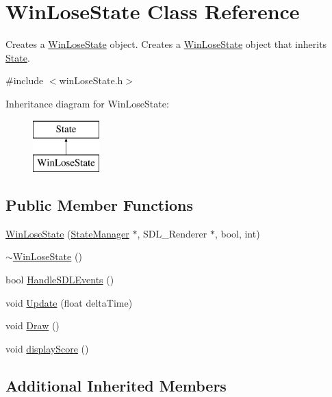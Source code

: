 \hypertarget{class_win_lose_state}{\section{Win\+Lose\+State Class Reference}
\label{class_win_lose_state}
}


Creates a \hyperlink{class_win_lose_state}{Win\+Lose\+State} object. Creates a \hyperlink{class_win_lose_state}{Win\+Lose\+State} object that inherits \hyperlink{class_state}{State}.  




{\ttfamily \#include $<$win\+Lose\+State.\+h$>$}

Inheritance diagram for Win\+Lose\+State\+:\begin{figure}[H]
\begin{center}
\leavevmode
\includegraphics[height=2.000000cm]{class_win_lose_state}
\end{center}
\end{figure}
\subsection*{Public Member Functions}
\begin{DoxyCompactItemize}
\item 
\hyperlink{class_win_lose_state_a047ccdc0cc156d65c076eb845398ef84}{Win\+Lose\+State} (\hyperlink{class_state_manager}{State\+Manager} $\ast$, S\+D\+L\+\_\+\+Renderer $\ast$, bool, int)
\item 
\hyperlink{class_win_lose_state_ac7ee2a9515081ba03b96cb78c5837d72}{$\sim$\+Win\+Lose\+State} ()
\item 
bool \hyperlink{class_win_lose_state_ada8c41baa8011df1aeae4b7b0d9b00f8}{Handle\+S\+D\+L\+Events} ()
\item 
void \hyperlink{class_win_lose_state_a98e675ce31aa41ad95ba36fd9e77dde6}{Update} (float delta\+Time)
\item 
void \hyperlink{class_win_lose_state_a862a5bb9422480b36671acb21cc987ba}{Draw} ()
\item 
void \hyperlink{class_win_lose_state_af7a44a05cae2f79731b9e36ea1ef4f7e}{display\+Score} ()
\end{DoxyCompactItemize}
\subsection*{Additional Inherited Members}


